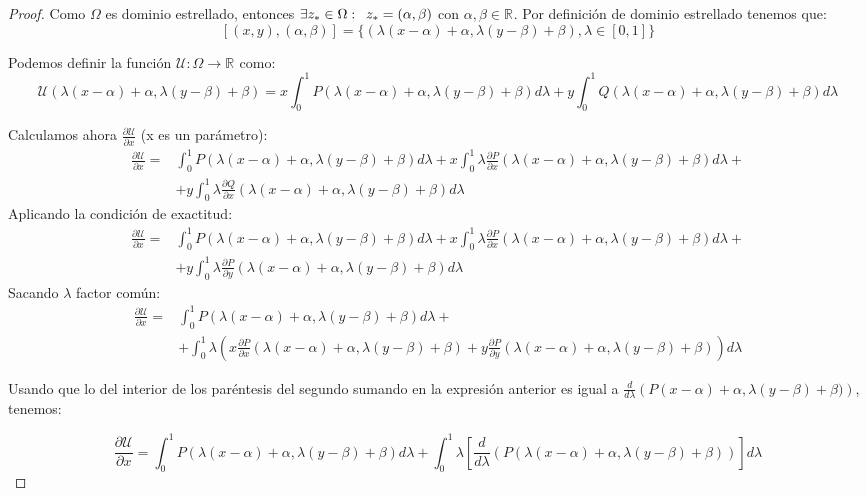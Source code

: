 \documentclass[12pt]{article}
\newcommand{\R}[1][]{\mathbb{R}^{#1}}
\newcommand{\U}{\mathcal{U}}
\newtheorem{proof}{Demostración:}
\begin{document}
\begin{proof}
Como $\Omega$ es dominio estrellado, entonces $\exists z_*\in\Omega:\enskip z_*=(\alpha, \beta)$ con $\alpha,\beta \in \R$. Por definición de dominio estrellado tenemos que:
\[
[(x,y),(\alpha, \beta)]=\{(\lambda(x-\alpha)+\alpha,\lambda(y-\beta)+\beta),\lambda\in[0,1]\}
\]

Podemos definir la función $\U: \Omega	\longrightarrow \R$ como:
\[
\U(\lambda(x-\alpha)+\alpha,\lambda(y-\beta)+\beta)=x\int_0^1P(\lambda(x-\alpha)+\alpha,\lambda(y-\beta)+\beta)d\lambda+y\int_0^1Q(\lambda(x-\alpha)+\alpha,\lambda(y-\beta)+\beta)d\lambda
\]

Calculamos ahora $\displaystyle\frac{\partial \U}{\partial x}$ (x es un parámetro):
\begin{align*}
\frac{\partial \U}{\partial x}=& \int_0^1 P(\lambda(x-\alpha)+\alpha,\lambda(y-\beta)+\beta)d\lambda+x\int_0^1\lambda\frac{\partial P}{\partial x}(\lambda(x-\alpha)+\alpha,\lambda(y-\beta)+\beta)d\lambda+ \\
& +y\int_0^1\lambda\frac{\partial Q}{\partial x}(\lambda(x-\alpha)+\alpha,\lambda(y-\beta)+\beta)d\lambda
\end{align*}
Aplicando la condición de exactitud:
\begin{align*}
\frac{\partial \U}{\partial x}=& \int_0^1 P(\lambda(x-\alpha)+\alpha,\lambda(y-\beta)+\beta)d\lambda+x\int_0^1\lambda\frac{\partial P}{\partial x}(\lambda(x-\alpha)+\alpha,\lambda(y-\beta)+\beta)d\lambda+ \\
& +y\int_0^1\lambda\frac{\partial P}{\partial y}(\lambda(x-\alpha)+\alpha,\lambda(y-\beta)+\beta)d\lambda
\end{align*}
Sacando $\lambda$ factor común:
\begin{align*}
\frac{\partial \U}{\partial x}=& \int_0^1 P(\lambda(x-\alpha)+\alpha,\lambda(y-\beta)+\beta)d\lambda+\\
& +\int_0^1\lambda \left(x\frac{\partial P}{\partial x}(\lambda(x-\alpha)+\alpha,\lambda(y-\beta)+\beta)+y\frac{\partial P}{\partial y}(\lambda(x-\alpha)+\alpha,\lambda(y-\beta)+\beta)\right)d\lambda
\end{align*}

Usando que lo del interior de los paréntesis del segundo sumando en la expresión anterior es igual a $\displaystyle\frac{d}{d\lambda}\left(P(x-\alpha)+\alpha,\lambda(y-\beta)+\beta)\right)$, tenemos:

\[
\frac{\partial \U}{\partial x}=\int_0^1 P(\lambda(x-\alpha)+\alpha,\lambda(y-\beta)+\beta)d\lambda+\int_0^1\lambda \left[\displaystyle\frac{d}{d\lambda}\left(P(\lambda(x-\alpha)+\alpha,\lambda(y-\beta)+\beta)\right)\right]d\lambda	
\]


\end{proof}
\end{document}
